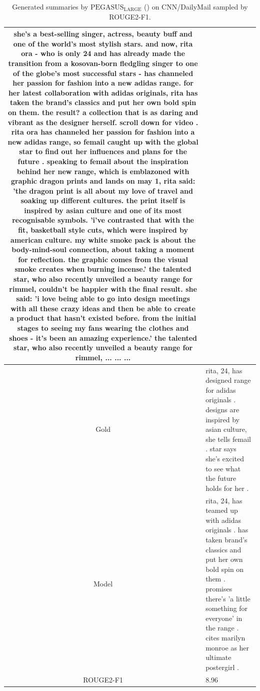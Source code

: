 \begin{table}[bth!]
\begin{tabular}{c|p{}}
she's a best-selling singer, actress, beauty buff and one of the world's most stylish stars. and now, rita ora - who is only 24 and has already made the transition from a kosovan-born fledgling singer to one of the globe's most successful stars - has channeled her passion for fashion into a new adidas range. for her latest collaboration with adidas originals, rita has taken the brand's classics and put her own bold spin on them. the result? a collection that is as daring and vibrant as the designer herself. scroll down for video . rita ora has channeled her passion for fashion into a new adidas range, so femail caught up with the global star to find out her influences and plans for the future . speaking to femail about the inspiration behind her new range, which is emblazoned with graphic dragon prints and lands on may 1, rita said: 'the dragon print is all about my love of travel and soaking up different cultures. the print itself is inspired by asian culture and one of its most recognisable symbols. 'i’ve contrasted that with the fit, basketball style cuts, which were inspired by american culture. my white smoke pack is about the body-mind-soul connection, about taking a moment for reflection. the graphic comes from the visual smoke creates when burning incense.' the talented star, who also recently unveiled a beauty range for rimmel, couldn't be happier with the final result. she said: 'i love being able to go into design meetings with all these crazy ideas and then be able to create a product that hasn’t existed before. from the initial stages to seeing my fans wearing the clothes and shoes - it’s been an amazing experience.' the talented star, who also recently unveiled a beauty range for rimmel, ... ... ... 
\\ \hline
Gold & 
rita, 24, has designed range for adidas originals . designs are inspired by asian culture, she tells femail . star says she's excited to see what the future holds for her .
\\ \hline
Model & 
rita, 24, has teamed up with adidas originals . has taken brand's classics and put her own bold spin on them . promises there's 'a little something for everyone' in the range . cites marilyn monroe as her ultimate postergirl .
\\ \hline
ROUGE2-F1 & 
8.96
\\ \hline
\end{tabular}
\caption{Generated summaries by $\text{PEGASUS}_{\text{LARGE}}$ (\gnews) on CNN/DailyMail sampled by ROUGE2-F1.}
\end{table}
